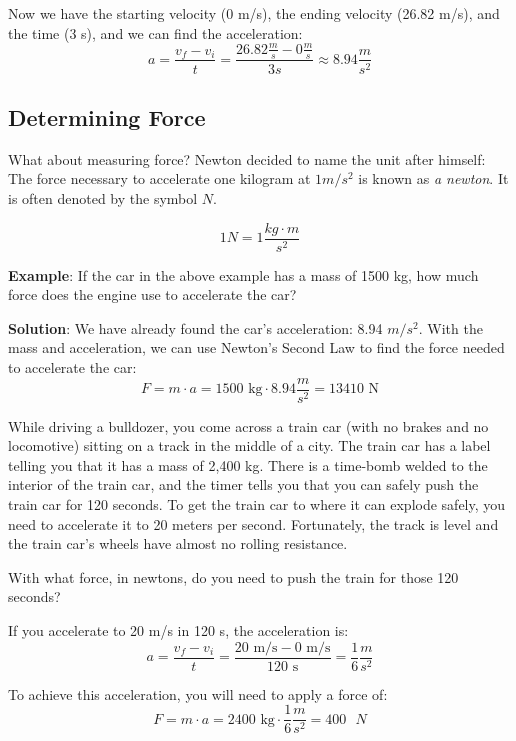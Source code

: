 Now we have the starting velocity (0 m/s), the ending velocity (26.82 m/s), and 
the time (3 s), and we can find the acceleration:
$$a = \frac{v_f - v_i}{t} = \frac{26.82\frac{m}{s} - 0\frac{m}{s}}{3s} \approx 
8.94 \frac{m}{s^2}$$

\subsection{Determining Force}
What about measuring force? Newton decided to name the unit after himself: The
force necessary to accelerate one kilogram at $1 m/s^2$ is known as \textit{a
newton}. It is often denoted by the symbol $N$.

$$1 N = 1 \frac{kg \cdot m}{s^2}$$

\textbf{Example}: If the car in the above example has a mass of 1500 kg, how much 
force does the engine use to accelerate the car?

\textbf{Solution}: We have already found the car's acceleration: 8.94 $m/s^2$. 
With the mass and acceleration, we can use Newton's Second Law to find the force 
needed to accelerate the car:
$$F = m \cdot a = 1500\text{ kg} \cdot 8.94 \frac{m}{s^2} = 13410\text{ N}$$

\begin{Exercise}[title={Acceleration}, label=acceleration_train]

While driving a bulldozer, you come across a train car (with no brakes
and no locomotive) sitting on a track in the middle of a city. The train car
has a label telling you that it has a mass of 2,400 kg. There is a time-bomb
welded to the interior of the train car, and the timer tells you that
you can safely push the train car for 120 seconds. To get the train
car to where it can explode safely, you need to accelerate it to 20 meters per
second. Fortunately, the track is level and the train car's wheels have
almost no rolling resistance.

With what force, in newtons, do you need to push the train for those 120 seconds?

\end{Exercise}
\begin{Answer}[ref=acceleration_train]
If you accelerate to 20 m/s in 120 s, the acceleration is:
$$a = \frac{v_f - v_i}{t} = \frac{20\text{ m/s} - 0\text{ m/s}}{120\text{ s}} = 
\frac{1}{6} \frac{m}{s^2}$$

To achieve this acceleration, you will need to apply a force of:
$$F = m \cdot a = 2400\text{ kg} \cdot \frac{1}{6} \frac{m}{s^2} = 400\text{ }N$$
\end{Answer}

